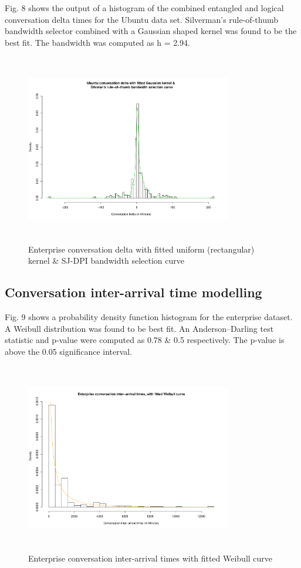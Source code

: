 \documentclass[conference]{IEEEtran}
\begin{document}
Fig. 8 shows the output of a histogram of the combined entangled and logical conversation delta times for the Ubuntu data set. Silverman's rule-of-thumb bandwidth selector combined with a Gaussian shaped kernel was found to be the best fit.  The bandwidth was computed as h = 2.94.

\begin{figure}
\begin{center}
\includegraphics[height=8.3cm, width=9cm]{08_delta_kde_ubuntu.pdf} 
\caption{Enterprise conversation delta with fitted uniform (rectangular) kernel & \n SJ-DPI bandwidth selection curve}
\end{center}
\label{fig:delta_kde_ubun}
\end{figure}

\subsection{Conversation inter-arrival time modelling}


Fig. 9 shows a probability density function histogram for the enterprise dataset. A  Weibull distribution was found to be best fit. An Anderson--Darling test statistic and p-value were computed as 0.78 \& 0.5 respectively. The p-value is above the 0.05 significance interval. 

\begin{figure}
\begin{center}
\includegraphics[height=8.3cm, width=9cm]{09_interarrival_enterprise.pdf} 
\caption{Enterprise conversation inter-arrival times with fitted Weibull curve}
\end{center}
\label{fig:interarrival_ent}
\end{figure}
\end{document}
